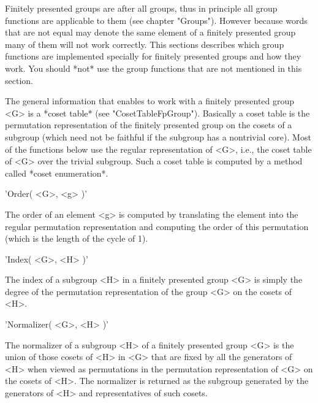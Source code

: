 
Finitely presented groups  are after  all groups, thus  in  principle all
group functions are  applicable  to them (see chapter "Groups").  However
because  words  that are  not  equal  may denote  the same element  of  a
finitely presented group many of  them  will  not  work correctly.   This
sections describes which group  functions are implemented  specially  for
finitely  presented groups and how they  work.  You should *not* use  the
group functions that are not mentioned in this section.

The  general  information that  enables {\GAP} to  work  with a  finitely
presented  group  <G>  is  a  *coset  table*  (see  "CosetTableFpGroup").
Basically a coset table is the permutation representation of the finitely
presented group on the cosets of a  subgroup (which need  not be faithful
if the subgroup has a  nontrivial core).  Most of the functions below use
the regular representation of <G>, i.e., the coset table  of <G> over the
trivial subgroup.  Such  a coset  table is computed  by a  method  called
*coset enumeration*.

\vspace{5mm}
'Order( <G>, <g> )'%

The  order of an  element <g> is computed by translating the element into
the  regular  permutation representation and computing the order of  this
permutation (which is the length of the cycle of 1).

\vspace{5mm}
'Index( <G>, <H> )'%

The index of  a subgroup <H> in a  finitely presented group <G> is simply
the  degree of  the  permutation  representation of the group  <G> on the
cosets of <H>.

\vspace{5mm}
'Normalizer( <G>, <H> )'%

The normalizer of a subgroup <H> of a finitely presented group <G> is the
union of those cosets of <H> in <G> that are fixed by all  the generators
of <H> when  viewed as permutations in  the permutation representation of
<G> on the  cosets  of <H>.   The normalizer is returned as the  subgroup
generated by the generators of <H> and representatives of such cosets.

